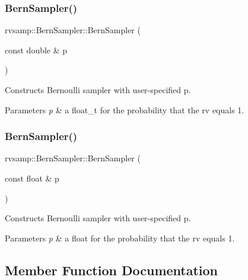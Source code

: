 \subsubsection{\texorpdfstring{Bern\+Sampler()}{BernSampler()}\hspace{0.1cm}{\footnotesize\ttfamily [1/2]}}
{\footnotesize\ttfamily rvsamp\+::\+Bern\+Sampler\+::\+Bern\+Sampler (\begin{DoxyParamCaption}\item[{const double \&}]{p }\end{DoxyParamCaption})}



Constructs Bernoulli sampler with user-\/specified p. 


\begin{DoxyParams}{Parameters}
{\em p} & a float\+\_\+t for the probability that the rv equals 1. \\
\hline
\end{DoxyParams}
\mbox{\label{classrvsamp_1_1BernSampler_a3e48a918a7be355435ae1ab425974c6d}} 
\subsubsection{\texorpdfstring{Bern\+Sampler()}{BernSampler()}\hspace{0.1cm}{\footnotesize\ttfamily [2/2]}}
{\footnotesize\ttfamily rvsamp\+::\+Bern\+Sampler\+::\+Bern\+Sampler (\begin{DoxyParamCaption}\item[{const float \&}]{p }\end{DoxyParamCaption})}



Constructs Bernoulli sampler with user-\/specified p. 


\begin{DoxyParams}{Parameters}
{\em p} & a float for the probability that the rv equals 1. \\
\hline
\end{DoxyParams}


\subsection{Member Function Documentation}
\mbox{\label{classrvsamp_1_1BernSampler_aa12177f8517a1462d84e5fd964c7dadb}} 
